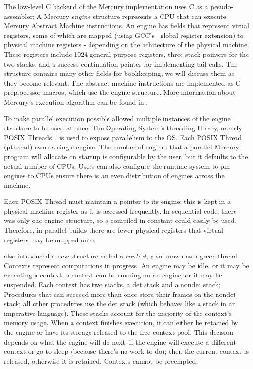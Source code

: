 
The low-level C backend of the Mercury implementation uses C as a
pesudo-assembler;
A Mercury \emph{engine} structure represents a CPU that can execute Mercury
Abstract Machine instructions.
An engine has fields that represent virual registers,
some of which are mapped (using GCC's~\citep{gcc} global register extension) to
physical machine registers - depending on the achitecture of the physical
machine.
These registers include 1024 general-purpose registers,
three stack pointers for the two stacks,
and a success continuation pointer for implementing tail-calls.
The structure contains many other fields for bookkeeping,
we will discuss them as they become relevant.
The abstract machine instructions are implemented as C preprocessor macros,
which use the engine structure.
More information about Mercury's execution algorithm can be found in
\citet{mercury_jlp}.

To make parallel execution possible \citet{conway:2002:par} allowed
multiple instances of the engine structure to be used at once.
The Operating System's threading library,
namely POSIX Threads~\citep{pthreads},
is used to expose parallelism to the OS.
Each POSIX Thread (pthread) owns a single engine.
The number of engines that a parallel Mercury program will allocate on startup
is configurable by the user,
but it defaults to the actual number of CPUs.
Users can also configure the runtime system to pin engines to CPUs
ensure there is an even distribution of engines across the machine.

Eacn POSIX Thread must maintain a pointer to its engine;
this is kept in a physical machine register as it is accessed
frequently.
In sequential code,
there was only one engine structure,
so a compiled-in constant could easily be used.
Therefore, in parallel builds there are fewer physical registers that
virtual registers may be mapped onto.

\citet{conway:2002:par} also introduced a new structure called a
\emph{context}, also known as a green thread.
Contexts represent computations in progress.
An engine may be idle, or it may be executing a context;
a context can be running on an engine, or it may be suspended.
Each context has two stacks, a det stack and a nondet stack;
Procedures that can succeed more than once
store their frames on the nondet stack;
all other procedures use the det stack
(which behaves like a stack in an imperative language).
These stacks account for the majority of the context's memory usage.
When a context finishes execution,
it can either be retained by the engine or have its storage released to the
free context pool.
This decision depends on what the engine will do next,
if the engine will execute a different context or go to sleep
(because there's no work to do);
then the current context is released,
otherwise it is retained.
Contexts cannot be preempted.

